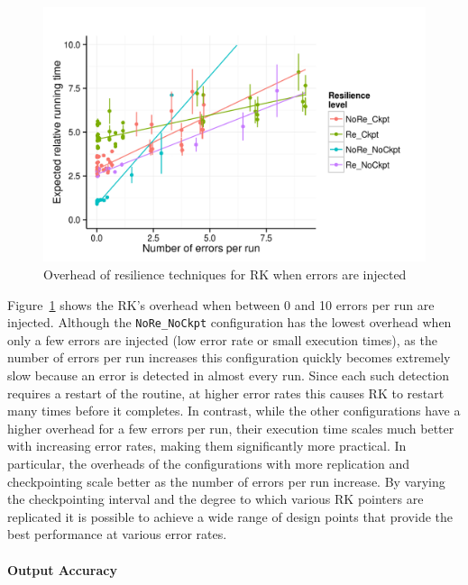 \documentclass{sig-alternate}
\begin{document}
{\begin{figure}[ht!]
\centering
\includegraphics[width=1.00\columnwidth]{figs/4_1_2_Exp2_Expected_Running_Time_Needed.png}
\caption{Overhead of resilience techniques for RK when errors are injected}
\label{fig:rk_routine_exp_exec}
\end{figure}

Figure~\ref{fig:rk_routine_exp_exec} shows the RK's overhead when between 0 and 10 errors per run are injected.%
Although the \texttt{NoRe\_NoCkpt} configuration has the lowest overhead when only a few errors are injected (low error rate or small execution times), as the number of errors per run increases this configuration quickly becomes extremely slow because an error is detected in almost every run.
Since each such detection requires a restart of the routine, at higher error rates this causes RK to restart many times before it completes.
In contrast, while the other configurations have a higher overhead for a few errors per run, their execution time scales much better with increasing error rates, making them significantly more practical.
In particular, the overheads of the configurations with more replication and checkpointing scale better as the number of errors per run increase.
By varying the checkpointing interval and the degree to which various RK pointers are replicated it is possible to achieve a wide range of design points that provide the best performance at various error rates.

\paragraph{Output Accuracy}

}
\end{document}
